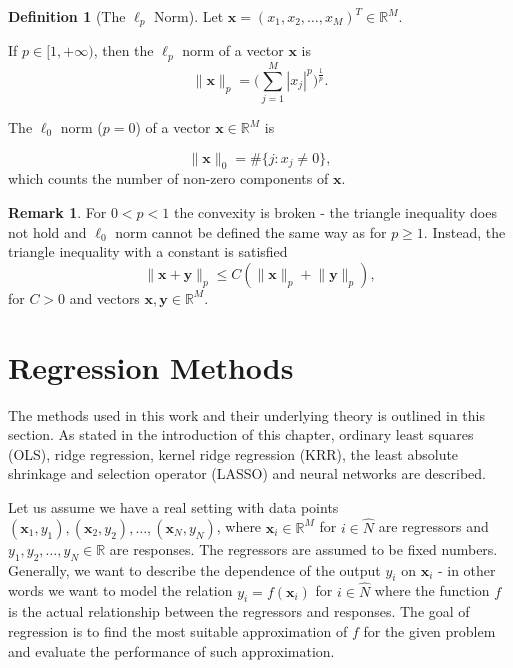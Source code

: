 \documentclass[11pt,oneside,czech,american]{book} %
\theoremstyle{definition} %
\theoremstyle{definition}
\newtheorem{defn}{Definition}
\newtheorem{rmrk}{Remark}
\begin{document}
\begin{defn}[The {$\ell_{p}$ Norm}]
	Let $\bm{x}= ({x}_{1},{x}_{2},\dots,{x}_{M})^{T} \in \mathbb{R}^{M}$.
	\begin{enumerate}{
			\item If $p \in [1, +\infty)$, then the $\ell_{p}$ norm of a vector $\bm{x}$ is 
			\begin{equation}
				\lVert \bm{x}\rVert_{p} = \Bigg(\sum_{j=1}^{M}|{x}_j|^{p}\Bigg)^{ \frac{1}{p}}
				\label{lpnorm}.
		\end{equation}}
		
		\item {The $\ell_{0}$ norm ($p = 0$) of a vector $\bm{x} \in \mathbb{R}^M$ is 
			
			\begin{equation}
				\lVert \bm{x} \rVert_{0} = \#\{j:{x}_j\neq 0 \}, \label{l0norm}
			\end{equation} which counts the number of non-zero components of $\bm{x}$.}
	\end{enumerate}
\end{defn}

\begin{rmrk}
	For $0<p<1$ the convexity is broken - the triangle inequality does not hold and $\ell_{0}$ norm cannot be defined the same way as for $p\geq1$. Instead, the triangle inequality with a constant is satisfied
	\begin{equation}
		\lVert \bm{x} + \bm{y} \rVert_{p} \leq C ( \lVert \bm{x} \rVert_{p} + \lVert \bm{y} \rVert_{p} ),
	\end{equation}
	for $C>0$ and vectors $\bm{x},\bm{y} \in \mathbb{R}^M$.
\end{rmrk}

\section{Regression Methods}
The methods used in this work and their underlying theory is outlined in this section. As stated in the introduction of this chapter, ordinary least squares (OLS), ridge regression, kernel ridge regression (KRR), the least absolute shrinkage and selection operator (LASSO) and neural networks are described.

Let us assume we have a real setting with data points $(\bm{x}_1,y_1), (\bm{x}_2,y_2),\dots, (\bm{x}_N,y_N)$, where $\bm{x}_i \in \mathbb{R}^{M}$ for $i \in \hat{N}$ are regressors and $y_{1}, y_{2},\dots, y_{N} \in \mathbb{R}$ are responses. The regressors are assumed to be fixed numbers. Generally, we want to describe the dependence of the output $y_{i}$ on $\bm{x}_{i}$ - in other words we want to model the relation $y_{i}=f({\bm{x}}_{i})$ for $i \in \hat{N}$ where the function $f$ is the actual relationship between the regressors and responses. The goal of regression is to find the most suitable approximation of $f$ for the given problem and evaluate the performance of such approximation.
\end{document}
